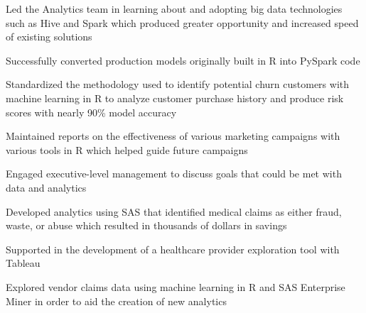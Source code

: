 \documentclass[]{plushcv}
\begin{document}
\begin{minipage}[t]{0.70\textwidth}
\begin{tightemize}
\sectionsep
\item Led the Analytics team in learning about and adopting
big data technologies such as Hive and Spark which
produced greater opportunity and increased speed of
existing solutions
\item Successfully converted production models originally
built in R into PySpark code
\item Standardized the methodology used to identify potential
churn customers with machine learning in R to analyze
customer purchase history and produce risk scores with
nearly 90\% model accuracy
\item Maintained reports on the effectiveness of various
marketing campaigns with various tools in R which
helped guide future campaigns
\item Engaged executive-level management to discuss
goals that could be met with data and analytics
\end{tightemize}
\sectionsep

\begin{tightemize}
\sectionsep
\item Developed analytics using SAS that identified medical claims as either fraud, waste, or abuse which resulted in thousands of dollars in savings
\item Supported in the development of a healthcare provider exploration tool with Tableau 
\item Explored vendor claims data using machine learning in R and SAS Enterprise Miner in order to aid the creation of new analytics  
\end{tightemize}
\sectionsep

%
%

\end{minipage} 
\hfill
\end{document}
